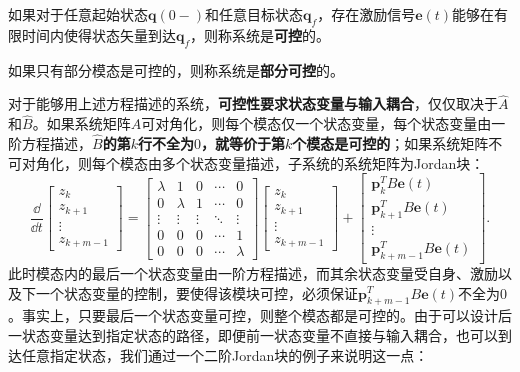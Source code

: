 \begin{definition}[可控性]
    如果对于任意起始状态$\mathbf{q}(0-)$和任意目标状态$\mathbf{q}_f$，存在激励信号$\mathbf{e}(t)$能够在有限时间内使得状态矢量到达$\mathbf{q}_f$，则称系统是\textbf{可控}的。

    如果只有部分模态是可控的，则称系统是\textbf{部分可控}的。
\end{definition}

对于能够用上述方程描述的系统，\textbf{可控性要求状态变量与输入耦合}，仅仅取决于$\hat{A}$和$\hat{B}$。如果系统矩阵$A$可对角化，则每个模态仅一个状态变量，每个状态变量由一阶方程描述，\textbf{$\hat{B}$的第$k$行不全为$0$，就等价于第$k$个模态是可控的}；如果系统矩阵不可对角化，则每个模态由多个状态变量描述，子系统的系统矩阵为Jordan块：
\begin{equation}
    \frac{\dd}{\dd t}\begin{bmatrix}
    z_k\\
    z_{k+1}\\
    \vdots\\
    z_{k+m-1}
    \end{bmatrix}=\begin{bmatrix}
    \lambda & 1 & 0 & \cdots & 0\\
    0 & \lambda & 1 & \cdots & 0\\
    \vdots & \vdots & \vdots & \ddots & \vdots\\
    0 & 0 & 0 & \cdots & 1\\
    0 & 0 & 0 & \cdots & \lambda
    \end{bmatrix}\begin{bmatrix}
    z_k\\
    z_{k+1}\\
    \vdots\\
    z_{k+m-1}
    \end{bmatrix}+\begin{bmatrix}
    \mathbf{p}_k^T B\mathbf{e}(t)\\
    \mathbf{p}_{k+1}^T B\mathbf{e}(t)\\
    \vdots\\
    \mathbf{p}_{k+m-1}^T B\mathbf{e}(t)
    \end{bmatrix}.
\end{equation}
此时模态内的最后一个状态变量由一阶方程描述，而其余状态变量受自身、激励以及下一个状态变量的控制，要使得该模块可控，必须保证$\mathbf{p}_{k+m-1}^T B\mathbf{e}(t)$不全为$0$。事实上，只要最后一个状态变量可控，则整个模态都是可控的。由于可以设计后一状态变量达到指定状态的路径，即便前一状态变量不直接与输入耦合，也可以到达任意指定状态，我们通过一个二阶Jordan块的例子来说明这一点：
